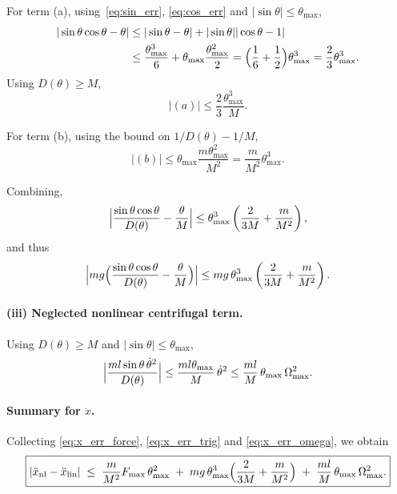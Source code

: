 \documentclass{article}
\begin{document}
For term (a), using~\eqref{eq:sin_err}, \eqref{eq:cos_err} and $|\sin\theta|\le\theta_{\max}$,
\begin{align}
|\sin\theta\cos\theta - \theta|
&\le |\sin\theta - \theta|
    + |\sin\theta||\cos\theta - 1| \nonumber\\
&\le \frac{\theta_{\max}^3}{6}
    + \theta_{\max}\frac{\theta_{\max}^2}{2}
 = \Bigl(\frac{1}{6} + \frac{1}{2}\Bigr)\theta_{\max}^3
 = \frac{2}{3}\theta_{\max}^3.
\end{align}
Using $D(\theta)\ge M$,
\[
|(a)| \le \frac{2}{3}\frac{\theta_{\max}^3}{M}.
\]

For term (b), using the bound on $1/D(\theta) - 1/M$,
\[
|(b)|
\le \theta_{\max}\frac{m\theta_{\max}^2}{M^2}
= \frac{m}{M^2}\theta_{\max}^3.
\]

Combining,
\[
\Bigl|
\frac{\sin\theta\cos\theta}{D(\theta)} - \frac{\theta}{M}
\Bigr|
\le
\theta_{\max}^3\left(
\frac{2}{3M} + \frac{m}{M^2}
\right),
\]
and thus
\begin{equation}
\Bigl|
m g\Bigl(\frac{\sin\theta\cos\theta}{D(\theta)} - \frac{\theta}{M}\Bigr)
\Bigr|
\le
m g\,\theta_{\max}^3
\left(
\frac{2}{3M} + \frac{m}{M^2}
\right).
\label{eq:x_err_trig}
\end{equation}

\paragraph*{(iii) Neglected nonlinear centrifugal term.}
Using $D(\theta)\ge M$ and $|\sin\theta|\le\theta_{\max}$,
\begin{equation}
\Bigl|\frac{m l\sin\theta\,\dot\theta^2}{D(\theta)}\Bigr|
\le \frac{m l\theta_{\max}}{M}\,\dot\theta^2
\le \frac{m l}{M}\,\theta_{\max}\,\Omega_{\max}^2.
\label{eq:x_err_omega}
\end{equation}

\paragraph*{Summary for $\ddot x$.}
Collecting \eqref{eq:x_err_force}, \eqref{eq:x_err_trig} and \eqref{eq:x_err_omega}, we obtain
\begin{equation}
\boxed{
|\ddot x_{\mathrm{nl}} - \ddot x_{\mathrm{lin}}|
\;\le\;
\frac{m}{M^2}F_{\max}\,\theta_{\max}^2
\;+\;
m g\,\theta_{\max}^3\Bigl(
\frac{2}{3M} + \frac{m}{M^2}
\Bigr)
\;+\;
\frac{m l}{M}\,\theta_{\max}\,\Omega_{\max}^2.
}
\label{eq:x_error_bound}
\end{equation}
\end{document}
